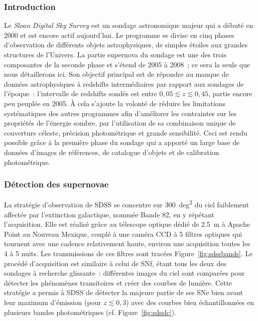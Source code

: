 \documentclass[../main/main.tex]{subfiles}
\begin{document}
\subsubsection{Introduction}\label{sssec:sdssintro}

Le \textit{Sloan Digital Sky Survey} \citep[SDSS,][]{frieman2008, sako2008,
sako2018} est un sondage astronomique majeur qui a débuté en 2000 et est encore
actif aujourd'hui. Le programme se divise en cinq phases d'observation de
différents objets astrophysiques, de simples étoiles aux grandes structures de
l'Univers. La partie supernova du sondage est une des trois composantes de la
seconde phase et s'étend de 2005 à 2008~; ce sera la seule que nous détaillerons
ici. Son objectif principal est de répondre au manque de données astrophysiques
à redshifts intermédiaires par rapport aux sondages de l'époque~: l'intervalle
de redshifts sondés est entre $0,05 \lesssim z \lesssim 0,45$, partie encore peu
peuplée en 2005. À cela s'ajoute la volonté de réduire les limitations
systématiques des autres programmes afin d'améliorer les contraintes sur les
propriétés de l'énergie sombre, par l'utilisation de sa combinaison unique de
couverture céleste, précision photométrique et grande sensibilité. Ceci est
rendu possible grâce à la première phase du sondage qui a apporté un large base
de données d'images de références, de catalogue d'objets et de calibration
photométrique.

\subsubsection{Détection des supernovae}\label{sssec:sdssdetec}

La stratégie d'observation de SDSS se concentre sur \SI{300}{deg^2} du ciel
faiblement affectée par l'extinction galactique, nommée Bande 82, en y répétant
l'acquisition. Elle est réalisé grâce au télescope optique dédié de \SI{2,5}{m}
\citep{gunn2006} à Apache Point au Nouveau Mexique, couplé à une caméra CCD
\citep{gunn1998} à 5 filtres optiques \citep[$ugriz$,][]{fukugita1996} qui
tournent avec une cadence relativement haute, environ une acquisition toutes les
4 à 5 nuits. Les transmissions de ces filtres sont tracées
Figure~\ref{fig:sdssbands}. Le procédé d'acquisition est similaire à celui de
SNf, étant tous les deux des sondages à recherche glissante~: différentes images
du ciel sont comparées pour détecter les phénomènes transitoires et créer des
courbes de lumière. Cette stratégie a permis à SDSS de détecter la majeure
partie de ses SNe bien avant leur maximum d'émission (pour $z \lesssim 0,3$)
avec des courbes bien échantillonnées en plusieurs bandes photométriques (cf.
Figure~\ref{fig:sdsslc}).
\end{document}
